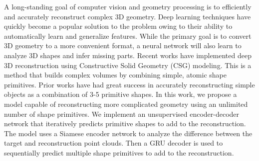 A long-standing goal of computer vision and geometry processing is to efficiently and accurately reconstruct complex 3D geometry. Deep learning techniques have quickly become a popular solution to the problem owing to their ability to automatically learn and generalize features. While the primary goal is to convert 3D geometry to a more convenient format, a neural network will also learn to analyze 3D shapes and infer missing parts. Recent works have implemented deep 3D reconstruction using Constructive Solid Geometry (CSG) modeling. This is a method that builds complex volumes by combining simple, atomic shape primitives. Prior works have had great success in accurately reconstructing simple objects as a combination of 3-5 primitive shapes. In this work, we propose a model capable of reconstructing more complicated geometry using an unlimited number of shape primitives. We implement an unsupervised encoder-decoder network that iteratively predicts primitive shapes to add to the reconstruction. The model uses a Siamese encoder network to analyze the difference between the target and reconstruction point clouds. Then a GRU decoder is used to sequentially predict multiple shape primitives to add to the reconstruction.